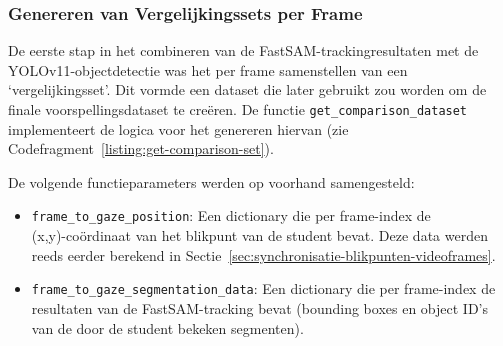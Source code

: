 \subsubsection{Genereren van Vergelijkingssets per Frame}

De eerste stap in het combineren van de FastSAM-trackingresultaten met de\\ YOLOv11-objectdetectie was het per frame samenstellen van een `vergelijkingsset'.
Dit vormde een dataset die later gebruikt zou worden om de finale voorspellingsdataset te creëren.
De functie \texttt{get\_comparison\_dataset} implementeert de logica voor het genereren hiervan (zie Codefragment~\ref{listing:get-comparison-set}).

De volgende functieparameters werden op voorhand samengesteld:
\begin{itemize}
    \item \texttt{frame\_to\_gaze\_position}: Een dictionary die per frame-index de\\ (x,y)-coördinaat van het 
    blikpunt van de student bevat. 
    Deze data werden reeds eerder berekend in Sectie~\ref{sec:synchronisatie-blikpunten-videoframes}.
    \item \texttt{frame\_to\_gaze\_segmentation\_data}: Een dictionary 
    die per frame-index de resultaten van de FastSAM-tracking bevat (bounding boxes en object ID's van de door de student bekeken segmenten).
\end{itemize}

